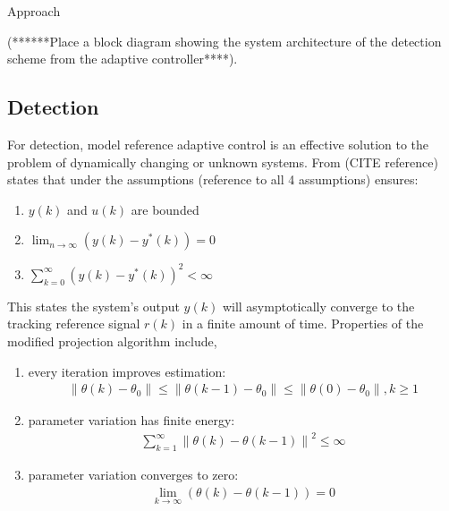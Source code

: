 
\begin{section}{Approach}
\label{sec:approach}


(******Place a block diagram showing the system architecture of the detection scheme from the adaptive controller****).

\subsection{Detection}
For detection, model reference adaptive control is an effective solution to the problem of dynamically changing or unknown systems. From (CITE reference) states that under the assumptions (reference to all 4 assumptions) ensures:
	\begin{enumerate}[label=(\roman*)]
	\item $y(k)$ and $u(k)$ are bounded 
	\item $\lim_{n\to\infty}(y(k)-y^*(k))=0$
	\item $\sum_{k=0}^\infty(y(k)-y^*(k))^2<\infty$
	\end{enumerate}
This states the system's output $y(k)$ will asymptotically converge to the tracking reference signal $r(k)$ in a finite amount of time. Properties of the modified projection algorithm include,
    \begin{enumerate}[label=(\roman*)]
	\item every iteration improves estimation:
	    \begin{align}
	        \|\theta(k)-\theta_0\|\leq\|\theta(k-1)-\theta_0\|\leq\|\theta(0)-\theta_0\|, k\geq1 \nonumber
	    \end{align}
	\item parameter variation has finite energy:
	    \begin{align}
	        \sum_{k=1}^\infty{\|\theta(k)-\theta(k-1)\|}^2\leq \infty \nonumber
	    \end{align}
	\item parameter variation converges to zero:
	    \begin{align}
	        \lim_{k\to\infty}(\theta(k)-\theta(k-1))=0 \nonumber
	    \end{align}
	    \begin{align}

\end{align}
\end{enumerate}
\end{section}
